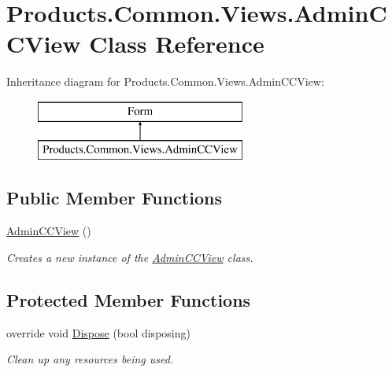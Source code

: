\hypertarget{class_products_1_1_common_1_1_views_1_1_admin_c_c_view}{}\section{Products.\+Common.\+Views.\+Admin\+C\+C\+View Class Reference}
\label{class_products_1_1_common_1_1_views_1_1_admin_c_c_view}
Inheritance diagram for Products.\+Common.\+Views.\+Admin\+C\+C\+View\+:\begin{figure}[H]
\begin{center}
\leavevmode
\includegraphics[height=2.000000cm]{class_products_1_1_common_1_1_views_1_1_admin_c_c_view}
\end{center}
\end{figure}
\subsection*{Public Member Functions}
\begin{DoxyCompactItemize}
\item 
\hyperlink{class_products_1_1_common_1_1_views_1_1_admin_c_c_view_ae013139dd8c7172e175dc4567797b327}{Admin\+C\+C\+View} ()
\begin{DoxyCompactList}\small\item\em Creates a new instance of the \hyperlink{class_products_1_1_common_1_1_views_1_1_admin_c_c_view}{Admin\+C\+C\+View} class. \end{DoxyCompactList}\end{DoxyCompactItemize}
\subsection*{Protected Member Functions}
\begin{DoxyCompactItemize}
\item 
override void \hyperlink{class_products_1_1_common_1_1_views_1_1_admin_c_c_view_afbbcd212d001494847aa0ffff5c56bcf}{Dispose} (bool disposing)
\begin{DoxyCompactList}\small\item\em Clean up any resources being used. \end{DoxyCompactList}\end{DoxyCompactItemize}


